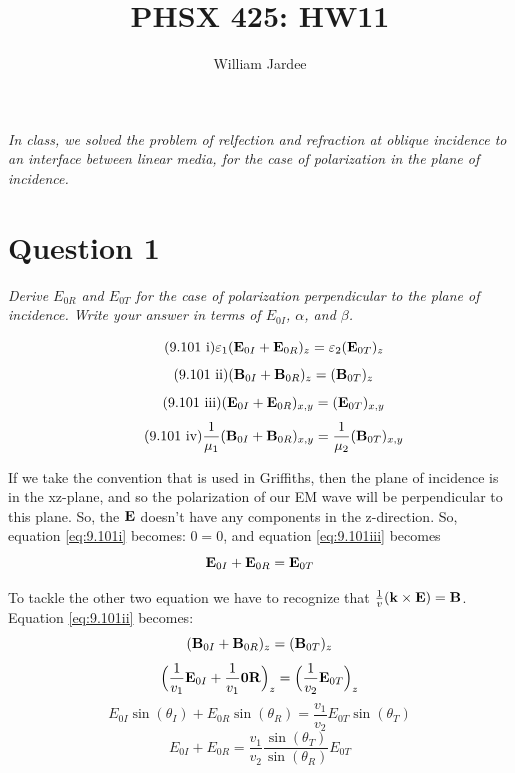 \documentclass[12pt]{article}
\begin{document}
\title{PHSX 425: HW11}
\author{William Jardee}
\maketitle

\noindent
\emph{In class, we solved the problem of relfection and refraction at oblique incidence to an interface between linear media, for the case of polarization in the plane of incidence.}
\section*{Question 1}
\emph{Derive $E_{0R}$ and $E_{0T}$ for the case of polarization perpendicular to the plane of incidence. Write your answer in terms of $E_{0I}$, $\alpha$, and $\beta$.}

\begin{equation}
	\tag{9.101 i}
	\varepsilon_1(\vb{E}_{0I} + \vb{E}_{0R})_z = \varepsilon_2 (\vb{E}_{0T})_z 
	\label{eq:9.101i}
\end{equation}
\begin{equation}
	\tag{9.101 ii}
	(\vb{B}_{0I} + \vb{B}_{0R})_z  = (\vb{B}_{0T})_z
	\label{eq:9.101ii}
\end{equation}
\begin{equation}
	\tag{9.101 iii}
	(\vb{E}_{0I} + \vb{E}_{0R})_{x,y} = (\vb{E}_{0T})_{x,y}
	\label{eq:9.101iii}
\end{equation}
\begin{equation}
	\tag{9.101 iv}
	\frac{1}{\mu_1}(\vb{B}_{0I} + \vb{B}_{0R})_{x,y} = \frac{1}{\mu_2}(\vb{B}_{0T})_{x,y}
	\label{eq:9.101iv}
\end{equation}

If we take the convention that is used in Griffiths, then the plane of incidence is in the xz-plane, and so the polarization of our EM wave will be perpendicular to this plane. So, the $\vb{E}$ doesn't have any components in the z-direction. So, equation \ref{eq:9.101i} becomes: $0=0$, and equation \ref{eq:9.101iii} becomes
\begin{equation}
	\vb{E}_{0I} + \vb{E}_{0R} = \vb{E}_{0T}
	\label{a}
\end{equation}

To tackle the other two equation we have to recognize that $\frac{1}{v}(\vb{k} \times \vb{E}) = \vb{B}$. Equation \ref{eq:9.101ii} becomes:
\[(\vb{B}_{0I} + \vb{B}_{0R})_z  = (\vb{B}_{0T})_z\]
\[\Big( \frac{1}{v_1}\vb{E}_{0I} + \frac{1}{v_1}\vb{0R} \Big)_z = \Big(\frac{1}{v_2}\vb{E}_{0T}\Big)_z\]
\[E_{0I}\sin(\theta_I) + E_{0R} \sin(\theta_R) = \frac{v_1}{v_2}E_{0T}\sin(\theta_T)\]
\begin{equation}
	E_{0I} + E_{0R} = \frac{v_1}{v_2}\frac{\sin(\theta_T)}{\sin(\theta_R)} E_{0T}
	\label{b}
\end{equation}
\end{document}
